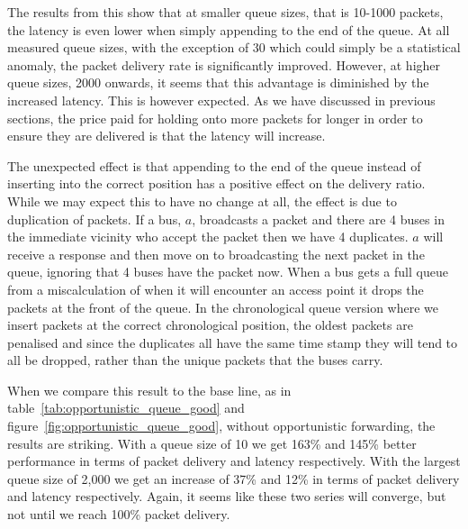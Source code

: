         The results from this show that at smaller queue sizes, that is 10-1000 packets, the latency is even lower when simply appending to the end of the queue. At all measured queue sizes, with the exception of 30 which could simply be a statistical anomaly, the packet delivery rate is significantly improved. However, at higher queue sizes, 2000 onwards, it seems that this advantage is diminished by the increased latency. This is however expected. As we have discussed in previous sections, the price paid for holding onto more packets for longer in order to ensure they are delivered is that the latency will increase. 

        The unexpected effect is that appending to the end of the queue instead of inserting into the correct position has a positive effect on the delivery ratio. While we may expect this to have no change at all, the effect is due to duplication of packets. If a bus, $a$, broadcasts a packet and there are 4 buses in the immediate vicinity who accept the packet then we have 4 duplicates. $a$ will receive a response and then move on to broadcasting the next packet in the queue, ignoring that 4 buses have the packet now. When a bus gets a full queue from a miscalculation of when it will encounter an access point it drops the packets at the front of the queue. In the chronological queue version where we insert packets at the correct chronological position, the oldest packets are penalised and since the duplicates all have the same time stamp they will tend to all be dropped, rather than the unique packets that the buses carry. 

        When we compare this result to the base line, as in table~\ref{tab:opportunistic_queue_good} and figure~\ref{fig:opportunistic_queue_good}, without opportunistic forwarding, the results are striking. With a queue size of 10 we get 163\% and 145\% better performance in terms of packet delivery and latency respectively. With the largest queue size of 2,000 we get an increase of 37\% and 12\% in terms of packet delivery and latency respectively. Again, it seems like these two series will converge, but not until we reach 100\% packet delivery.

